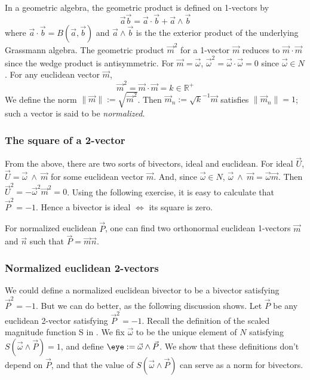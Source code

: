 \documentclass[12pt]{article}
\newcommand{\mydogblue}{{\color{gray} $\square$~~}}
\begin{document}
In a geometric algebra, the geometric product is defined on 1-vectors by \[\vec{a}\vec{b} = \vec{a}\cdot \vec{b} + \vec{a}\wedge \vec{b}\] where $ \vec{a}\cdot \vec{b} = B(\vec{a},\vec{b})$ and $\vec{a}\wedge \vec{b}$ is the the exterior product of the underlying Grassmann algebra. 
The geometric product $\vec{m}^{2}$ for a 1-vector $\vec{m}$ reduces to $\vec{m} \cdot \vec{m}$ since the wedge product is antisymmetric.  For $\vec{m} = \vec{\omega}$, $\vec{\omega}^{2} = \vec{\omega}\cdot \vec{\omega} = 0$ since $\vec{\omega} \in N$.  For any euclidean vector $\vec{m}$, \[ \vec{m}^{2} = \vec{m} \cdot \vec{m} = k \in \mathbb{R}^{+}\]  We define the norm $\| \vec{m} \| := \sqrt{\vec{m}^{2}}$.  Then $\vec{m}_{n} := \sqrt{k}^{-1}\vec{m}$ satisfies $\| \vec{m}_{n} \| = 1$; such a vector is said to be \emph{normalized}. %

\subsubsection{The square of a 2-vector}
\label{sec:neb}
From the above, there are two sorts of  bivectors, ideal and euclidean.  
 For  ideal $\vec{U}$,  $\vec{U} = \vec{\omega}~ \wedge ~\vec{m} $ for some euclidean vector $\vec{m}$. And, since $\vec{\omega} \in N$, $\vec{\omega}~ \wedge ~\vec{m}= \vec{\omega} \vec{m}$.  Then  $\vec{U}^{2} = -\vec{\omega}^{2} \vec{m}^{2} = 0$.   Using the following exercise, it is easy to calculate that $\vec{P}^{2} = -1$. %
 Hence a bivector is ideal $\iff$ its square is zero.  
 
 \myexercise  For normalized euclidean $\vec{P}$, one can find two orthonormal euclidean 1-vectors $\vec{m}$ and $\vec{n}$ such that $\vec{P} = \vec{m}\vec{n}$. %
 
 

\subsubsection{Normalized euclidean 2-vectors}
We could define a normalized euclidean bivector to be a bivector satisfying  $\vec{P}^{2}=-1$.  But we can do better, as the following discussion shows.  
Let $\vec{P}$ be any euclidean 2-vector satisfying $\vec{P}^{2}=-1$. Recall the definition of the scaled magnitude function S in . We fix $\vec{\omega}$ to be the unique element of $N$ satisfying $S(\vec{\omega} \wedge \vec{P}) = 1$, and define $\eye := \vec{\omega} \wedge \vec{P}$. We show that these definitions don't depend on $\vec{P}$, and that the value of $S(\vec{\omega} \wedge \vec{P})$ can serve as a norm for bivectors.
\end{document}

